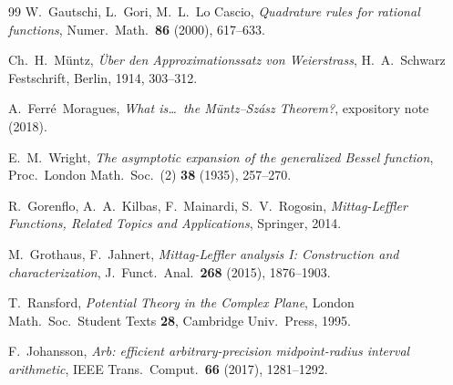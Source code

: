 \documentclass{article}
\begin{document}
\begin{thebibliography}{99}
W.~Gautschi, L.~Gori, M.~L.~Lo Cascio,
\emph{Quadrature rules for rational functions},
Numer.\ Math.\ \textbf{86} (2000), 617--633.

Ch.~H.~Müntz,
\emph{Über den Approximationssatz von Weierstrass},
H.~A.~Schwarz Festschrift, Berlin, 1914, 303--312.

A.~Ferré~Moragues,
\emph{What is\ldots\ the Müntz--Szász Theorem?},
expository note (2018).

E.~M.~Wright,
\emph{The asymptotic expansion of the generalized Bessel function},
Proc.\ London Math.\ Soc.\ (2) \textbf{38} (1935), 257--270.

R.~Gorenflo, A.~A.~Kilbas, F.~Mainardi, S.~V.~Rogosin,
\emph{Mittag-Leffler Functions, Related Topics and Applications},
Springer, 2014.

M.~Grothaus, F.~Jahnert,
\emph{Mittag-Leffler analysis I: Construction and characterization},
J.\ Funct.\ Anal.\ \textbf{268} (2015), 1876--1903.

T.~Ransford,
\emph{Potential Theory in the Complex Plane},
London Math.\ Soc.\ Student Texts \textbf{28}, Cambridge Univ.\ Press, 1995.

F.~Johansson,
\emph{Arb: efficient arbitrary-precision midpoint-radius interval arithmetic},
IEEE Trans.\ Comput.\ \textbf{66} (2017), 1281--1292.

\end{thebibliography}
\end{document}
